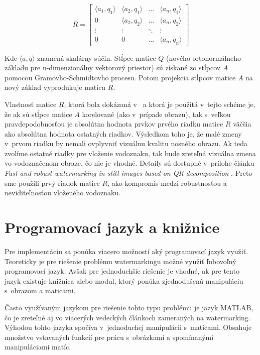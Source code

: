 \begin{equation}
R = \begin{bmatrix} 
\langle a_1, q_1 \rangle & \langle a_2, q_1 \rangle & \dots & \langle a_n, q_1 \rangle \\
0 & \langle a_2, q_2 \rangle & \dots & \langle a_n, q_2 \rangle \\
\vdots & \vdots & \ddots & \vdots \\
0 & 0 & \dots & \langle a_n, q_n \rangle
\end{bmatrix}
\end{equation}

Kde $\langle a,q\rangle$ znamená skalárny súčin. Stĺpce matice $Q$ (nového ortonormálneho základu pre n-dimenzionálny vektorový priestor) sú získané zo stĺpcov $A$ pomocou Gramovho-Schmidtovho procesu. Potom projekcia stĺpcov matice $A$ na nový základ vyprodukuje maticu $R$.

Vlastnosť matice $R$, ktorá bola dokázaná v~\cite{QRdecomposition} a ktorá je použitá v~tejto schéme je, že ak sú stĺpce matice $A$ korelované (ako v~prípade obrazu), tak s~veľkou pravdepodobnosťou je absolútna hodnota prvkov prvého riadku matice $R$ väčšia ako absolútna hodnota ostatných riadkov. Výsledkom toho je, že malé zmeny v~prvom riadku by nemali ovplyvniť vizuálnu kvalitu nosného obrazu. Ak teda zvolíme ostatné riadky pre vloženie vodoznaku, tak bude zreteľná vizuálna zmena vo vodoznačenom obraze, čo nie je vhodné. Detaily sú dostupné v~prílohe článku {\it Fast and robust watermarking in still images based on QR decomposition} \cite{QRdecomposition}. Preto sme použili prvý riadok matice $R$, ako kompromis medzi robustnosťou a neviditeľnosťou vloženého vodoznaku.


\section{Programovací jazyk a knižnice} \label{kniznice}
Pre implementáciu sa ponúka viacero možností aký programovací jazyk využiť. Teoreticky je pre riešenie problému watermarkingu možné využiť ľubovoľný programovací jazyk. Avšak pre jednoduchšie riešenie je vhodné, ak pre tento jazyk existuje knižnica alebo modul, ktorý ponúka zjednodušenú manipuláciu s~obrazom a maticami.

Často využívaným jazykom pre riešenie tohto typu problému je jazyk MATLAB, čo je zreteľné aj vo viacerých vedeckých článkoch zameraných na watermarking. Výhodou tohto jazyka spočíva v~jednoduchej manipulácii s~maticami. Obsahuje množstvo vstavaných funkcií pre prácu s~obrázkami a spomínanými manipuláciami matíc.

